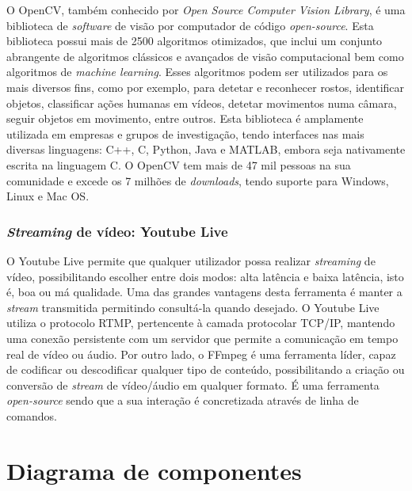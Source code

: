O OpenCV, também conhecido por \textit{Open Source Computer Vision Library}, é uma biblioteca de \textit{software} de visão por computador de código \textit{open-source}. Esta biblioteca possui mais de 2500 algoritmos otimizados, que inclui um conjunto abrangente de algoritmos clássicos e avançados de visão computacional bem como algoritmos de \textit{machine learning}. Esses algoritmos podem ser utilizados para os mais diversos fins, como por exemplo, para detetar e reconhecer rostos, identificar objetos, classificar ações humanas em vídeos, detetar movimentos numa câmara, seguir objetos em movimento, entre outros. Esta biblioteca é amplamente utilizada em empresas e grupos de investigação, tendo interfaces nas mais diversas linguagens: C++, C, Python, Java e MATLAB, embora seja nativamente escrita na linguagem C. O OpenCV tem mais de 47 mil pessoas na sua comunidade e excede os 7 milhões de \textit{downloads}, tendo suporte para Windows, Linux e Mac OS\cite{Itseez}.



\subsubsection{\textit{Streaming} de vídeo: Youtube Live}

 O Youtube Live permite que qualquer utilizador possa realizar \textit{streaming} de vídeo, possibilitando escolher entre dois modos: alta latência e baixa latência, isto é, boa ou má qualidade. Uma das grandes vantagens desta ferramenta é manter a \textit{stream} transmitida permitindo consultá-la quando desejado. O Youtube Live utiliza o protocolo \ac{RTMP}, pertencente à camada protocolar TCP/IP, mantendo uma conexão persistente com um servidor que permite a comunicação em tempo real de vídeo ou áudio. Por outro lado, o FFmpeg é uma ferramenta líder, capaz de codificar ou descodificar qualquer tipo de conteúdo, possibilitando a criação ou conversão de \textit{stream} de vídeo/áudio em qualquer formato. É uma ferramenta \textit{open-source} sendo que a sua interação é concretizada através de linha de comandos\cite{FFmpeg2015}. 







\section{Diagrama de componentes}

